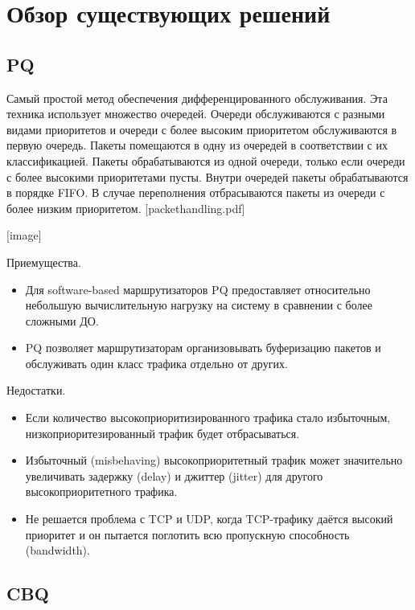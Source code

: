 \section{Обзор существующих решений}

	\subsection{PQ}

    Самый простой метод обеспечения дифференцированного обслуживания. Эта техника
    использует множество очередей. Очереди обслуживаются с разными видами приоритетов
    и очереди с более высоким приоритетом обслуживаются в первую очередь. Пакеты
    помещаются в одну из очередей в соответствии с их классификацией. Пакеты
    обрабатываются из одной очереди, только если очереди с более высокими приоритетами
    пусты. Внутри очередей пакеты обрабатываются в порядке FIFO. В случае переполнения
    отбрасываются пакеты из очереди с более низким приоритетом. [packethandling.pdf]

	[image]


	Приемущества.
	\begin{itemize}
		\item Для software-based маршрутизаторов PQ предоставляет относительно небольшую
             вычислительную нагрузку на систему в сравнении с более сложными ДО.
		\item PQ позволяет маршрутизаторам организовывать буферизацию пакетов и обслуживать
             один класс трафика отдельно от других.
	\end{itemize}


	Недостатки.
	\begin{itemize}
		\item Если количество высокоприоритизированного трафика стало избыточным,
            низкоприоритезированный трафик будет отбрасываться.
		\item Избыточный (misbehaving) высокоприоритетный трафик может значительно увеличивать
                задержку (delay) и джиттер (jitter) для другого высокоприоритетного трафика.
		\item Не решается проблема с TCP и UDP, когда TCP-трафику даётся высокий приоритет и он
                пытается поглотить всю пропускную способность (bandwidth).
	\end{itemize}



	\subsection{CBQ}

